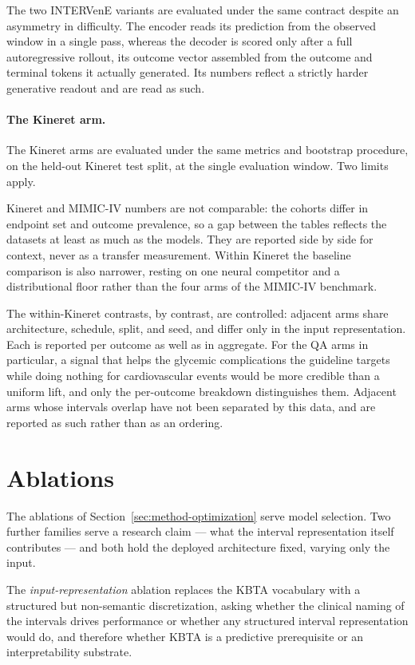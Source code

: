 The two INTERVenE variants are evaluated under the same contract despite an asymmetry in difficulty. The encoder reads its prediction from the observed window in a single pass, whereas the decoder is scored only after a full autoregressive rollout, its outcome vector assembled from the outcome and terminal tokens it actually generated. Its numbers reflect a strictly harder generative readout and are read as such.

\paragraph{The Kineret arm.}
The Kineret arms are evaluated under the same metrics and bootstrap procedure, on the held-out Kineret test split, at the single evaluation window. Two limits apply.

Kineret and MIMIC-IV numbers are not comparable: the cohorts differ in endpoint set and outcome prevalence, so a gap between the tables reflects the datasets at least as much as the models. They are reported side by side for context, never as a transfer measurement. Within Kineret the baseline comparison is also narrower, resting on one neural competitor and a distributional floor rather than the four arms of the MIMIC-IV benchmark.

The within-Kineret contrasts, by contrast, are controlled: adjacent arms share architecture, schedule, split, and seed, and differ only in the input representation. Each is reported per outcome as well as in aggregate. For the QA arms in particular, a signal that helps the glycemic complications the guideline targets while doing nothing for cardiovascular events would be more credible than a uniform lift, and only the per-outcome breakdown distinguishes them. Adjacent arms whose intervals overlap have not been separated by this data, and are reported as such rather than as an ordering.

\section{Ablations}
\label{sec:evalm-ablations}
\label{sec:method-ablations}

The ablations of Section~\ref{sec:method-optimization} serve model selection. Two further families serve a research claim --- what the interval representation itself contributes --- and both hold the deployed architecture fixed, varying only the input.

The \emph{input-representation} ablation replaces the KBTA vocabulary with a structured but non-semantic discretization, asking whether the clinical naming of the intervals drives performance or whether any structured interval representation would do, and therefore whether KBTA is a predictive prerequisite or an interpretability substrate.

